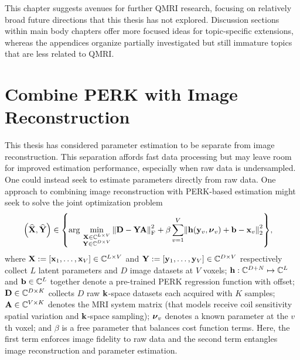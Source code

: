 
This chapter suggests avenues
for further QMRI research,
focusing on relatively broad future directions
that this thesis has not explored.
Discussion sections
within main body chapters
offer more focused ideas 
for topic-specific extensions,
whereas the appendices organize 
partially investigated but still immature topics
that are less related to QMRI.

\section{Combine PERK with Image Reconstruction}
\label{s,future,recon}

This thesis has considered parameter estimation
to be separate from image reconstruction.
This separation affords fast data processing
but may leave room for improved estimation performance,
especially when raw data is undersampled.
One could instead seek 
to estimate parameters 
directly from raw data.
One approach 
to combining image reconstruction
with PERK-based estimation
might seek to solve
the joint optimization problem
\begin{align}
	\paren{\est{\bmX},\est{\bmY}} &\in \set{%
		\argmin{%
			\substack{%
				\bmX \in \complexes{L \times V} \\
				\bmY \in \complexes{D \times V} \\
			}%
		}%
		\frob{\bmD-\bmY\bmA}^2 
			+ \beta \sum_{v=1}^V 
				\norm{\bmh\paren{\bmy_v,\bmnu_v}+\bmb-\bmx_v}^2_2
	},
	\label{eq:future,recon}
\end{align}
where 
$\bmX := \brac{\bmx_1,\dots,\bmx_V} \in \complexes{L \times V}$
and
$\bmY := \brac{\bmy_1,\dots,\bmy_V} \in \complexes{D \times V}$
respectively collect $L$ latent parameters 
and $D$ image datasets 
at $V$ voxels;
$\mathbf{h} : \mathbb{C}^{D+N} \mapsto \mathbb{C}^{L}$ 
and $\mathbf{b} \in \mathbb{C}^{L}$ 
together denote a pre-trained PERK regression function with offset;
$\mathbf{D} \in \mathbb{C}^{D \times K}$
collects $D$ raw $\mathbf{k}$-space datasets 
each acquired with $K$ samples;
$\mathbf{A} \in \mathbb{C}^{V \times K}$ 
denotes the MRI system matrix
(that models receive coil sensitivity spatial variation 
and $\mathbf{k}$-space sampling);
$\boldsymbol{\nu}_v$ denotes a known parameter at the $v$th voxel;
and $\beta$ is a free parameter
that balances cost function terms.
Here, 
the first term enforces 
image fidelity to raw data
and the second term entangles 
image reconstruction and parameter estimation.

